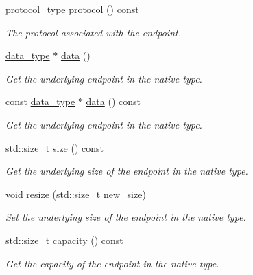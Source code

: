 \begin{DoxyCompactItemize}
\hyperlink{classasio_1_1generic_1_1basic__endpoint_adbb1d24211763cf405138afcc29330da}{protocol\+\_\+type} \hyperlink{classasio_1_1generic_1_1basic__endpoint_abbad655da7df6cf0613b5d03d44f3c62}{protocol} () const 
\begin{DoxyCompactList}\small\item\em The protocol associated with the endpoint. \end{DoxyCompactList}\item 
\hyperlink{classasio_1_1generic_1_1basic__endpoint_af8fe7c173ad82680b104c83000eab645}{data\+\_\+type} $\ast$ \hyperlink{classasio_1_1generic_1_1basic__endpoint_a719b41a4bac9b9e359fe4d8a774ed902}{data} ()
\begin{DoxyCompactList}\small\item\em Get the underlying endpoint in the native type. \end{DoxyCompactList}\item 
const \hyperlink{classasio_1_1generic_1_1basic__endpoint_af8fe7c173ad82680b104c83000eab645}{data\+\_\+type} $\ast$ \hyperlink{classasio_1_1generic_1_1basic__endpoint_aee104f0fd7b64a1163b94631ac4e6a3b}{data} () const 
\begin{DoxyCompactList}\small\item\em Get the underlying endpoint in the native type. \end{DoxyCompactList}\item 
std\+::size\+\_\+t \hyperlink{classasio_1_1generic_1_1basic__endpoint_a52e9c210f8e838c06e2ace5f1114247b}{size} () const 
\begin{DoxyCompactList}\small\item\em Get the underlying size of the endpoint in the native type. \end{DoxyCompactList}\item 
void \hyperlink{classasio_1_1generic_1_1basic__endpoint_a08bcf7a95cad0e221c78804dc371c4a9}{resize} (std\+::size\+\_\+t new\+\_\+size)
\begin{DoxyCompactList}\small\item\em Set the underlying size of the endpoint in the native type. \end{DoxyCompactList}\item 
std\+::size\+\_\+t \hyperlink{classasio_1_1generic_1_1basic__endpoint_a8cc68ec8d81681f0053b69c0273e16d7}{capacity} () const 
\begin{DoxyCompactList}\small\item\em Get the capacity of the endpoint in the native type. \end{DoxyCompactList}\end{DoxyCompactItemize}
